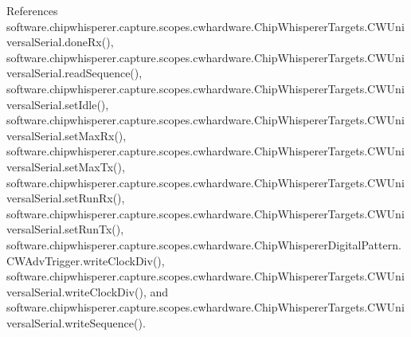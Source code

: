 References software.\+chipwhisperer.\+capture.\+scopes.\+cwhardware.\+Chip\+Whisperer\+Targets.\+C\+W\+Universal\+Serial.\+done\+Rx(), software.\+chipwhisperer.\+capture.\+scopes.\+cwhardware.\+Chip\+Whisperer\+Targets.\+C\+W\+Universal\+Serial.\+read\+Sequence(), software.\+chipwhisperer.\+capture.\+scopes.\+cwhardware.\+Chip\+Whisperer\+Targets.\+C\+W\+Universal\+Serial.\+set\+Idle(), software.\+chipwhisperer.\+capture.\+scopes.\+cwhardware.\+Chip\+Whisperer\+Targets.\+C\+W\+Universal\+Serial.\+set\+Max\+Rx(), software.\+chipwhisperer.\+capture.\+scopes.\+cwhardware.\+Chip\+Whisperer\+Targets.\+C\+W\+Universal\+Serial.\+set\+Max\+Tx(), software.\+chipwhisperer.\+capture.\+scopes.\+cwhardware.\+Chip\+Whisperer\+Targets.\+C\+W\+Universal\+Serial.\+set\+Run\+Rx(), software.\+chipwhisperer.\+capture.\+scopes.\+cwhardware.\+Chip\+Whisperer\+Targets.\+C\+W\+Universal\+Serial.\+set\+Run\+Tx(), software.\+chipwhisperer.\+capture.\+scopes.\+cwhardware.\+Chip\+Whisperer\+Digital\+Pattern.\+C\+W\+Adv\+Trigger.\+write\+Clock\+Div(), software.\+chipwhisperer.\+capture.\+scopes.\+cwhardware.\+Chip\+Whisperer\+Targets.\+C\+W\+Universal\+Serial.\+write\+Clock\+Div(), and software.\+chipwhisperer.\+capture.\+scopes.\+cwhardware.\+Chip\+Whisperer\+Targets.\+C\+W\+Universal\+Serial.\+write\+Sequence().


